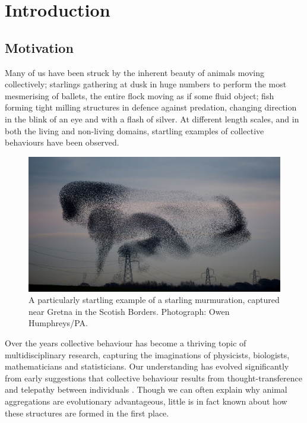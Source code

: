 \chapter{Introduction}
\label{cha:introduction}

\section{Motivation}
\label{sec:motivation}

Many of us have been struck by the inherent beauty of animals moving collectively; starlings gathering at dusk in huge numbers to perform the most mesmerising of ballets, the entire flock moving as if some fluid object; fish forming tight milling structures in defence against predation, changing direction in the blink of an eye and with a flash of silver. At different length scales, and in both the living and non-living domains, startling examples of collective behaviours have been observed.

\begin{figure}[!htbp]
	\centering
	\includegraphics[width=\textwidth]{fig/murmuration.jpg}
	\caption{A particularly startling example of a starling murmuration, captured near Gretna in the Scotish Borders. Photograph: Owen Humphreys/PA.}
	\label{fig:murmuration}
\end{figure}

Over the years collective behaviour has become a thriving topic of multidisciplinary research, capturing the imaginations of physicists, biologists, mathematicians and statisticians. Our understanding has evolved significantly from early suggestions that collective behaviour results from thought-transference and telepathy between individuals \citep{selous31}. Though we can often explain why animal aggregations are evolutionary advantageous, little is in fact known about how these structures are formed in the first place.

